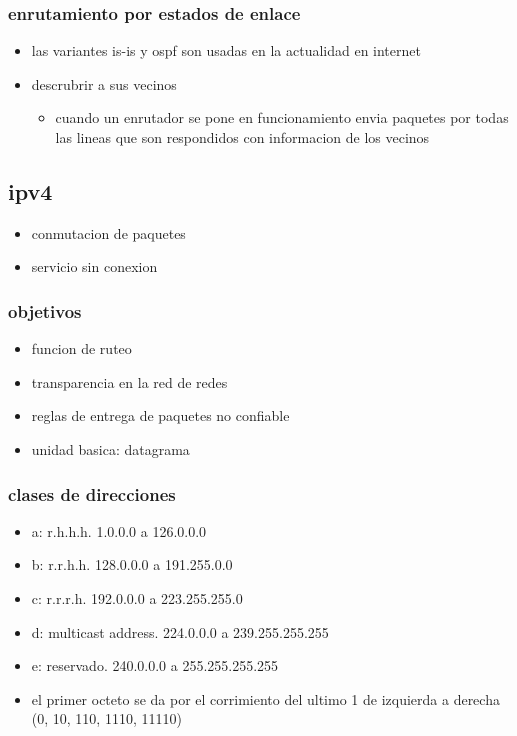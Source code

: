 \documentclass[11pt]{article}
\begin{document}
\subsubsection{enrutamiento por estados de enlace}
\label{sec:org0eb4efd}
\begin{itemize}
\item las variantes is-is y ospf son usadas en la actualidad en internet
\item descrubrir a sus vecinos
\begin{itemize}
\item cuando un enrutador se pone en funcionamiento envia paquetes por todas las lineas que son respondidos con informacion de los vecinos
\end{itemize}
\end{itemize}
\subsection{ipv4}
\label{sec:org11416c0}
\begin{itemize}
\item conmutacion de paquetes
\item servicio sin conexion
\end{itemize}
\subsubsection{objetivos}
\label{sec:org6a6ff54}
\begin{itemize}
\item funcion de ruteo
\item transparencia en la red de redes
\item reglas de entrega de paquetes no confiable
\item unidad basica: datagrama
\end{itemize}
\subsubsection{clases de direcciones}
\label{sec:org393db5f}
\begin{itemize}
\item a: r.h.h.h. 1.0.0.0 a 126.0.0.0
\item b: r.r.h.h. 128.0.0.0 a 191.255.0.0
\item c: r.r.r.h. 192.0.0.0 a 223.255.255.0
\item d: multicast address. 224.0.0.0 a 239.255.255.255
\item e: reservado. 240.0.0.0 a 255.255.255.255
\item el primer octeto se da por el corrimiento del ultimo 1 de izquierda a derecha (0, 10, 110, 1110, 11110)
\end{itemize}
\end{document}
